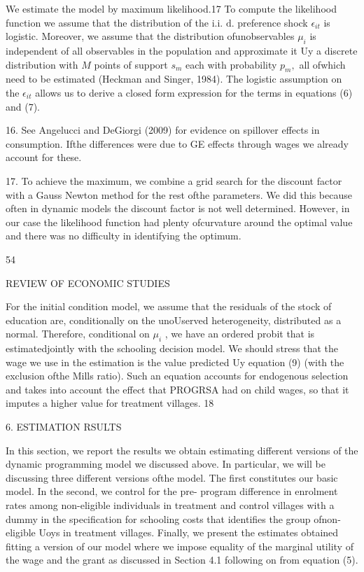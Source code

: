 We estimate the model by maximum likelihood.17 To compute the likelihood function we assume that the distribution of the i.i. $\mathrm{d}$. preference shock $\epsilon_{it}$ is logistic. Moreover, we assume that the distribution ofunobservables $\mu_{i}$ is independent of all observables in the population and approximate it Uy a discrete distribution with $M$ points of support $s_{m}$ each with probability $p_{m},$ all ofwhich need to be estimated (Heckman and Singer, 1984). The logistic assumption on the $\epsilon_{it}$ allows us to derive a closed form expression for the terms in equations (6) and (7).

16. See Angelucci and DeGiorgi (2009) for evidence on spillover effects in consumption. Ifthe differences were due to GE effects through wages we already account for these.

17. To achieve the maximum, we combine a grid search for the discount factor with a Gauss Newton method for the rest ofthe parameters. We did this because often in dynamic models the discount factor is not well determined. However, in our case the likelihood function had plenty ofcurvature around the optimal value and there was no difficulty in identifying the optimum.

54

REVIEW OF ECONOMIC STUDIES

For the initial condition model, we assume that the residuals of the stock of education are, conditionally on the unoUserved heterogeneity, distributed as a normal. Therefore, conditional on $\mu_{i}$ , we have an ordered probit that is estimatedjointly with the schooling decision model. We should stress that the wage we use in the estimation is the value predicted Uy equation (9) (with the exclusion ofthe Mills ratio). Such an equation accounts for endogenous selection and takes into account the effect that PROGRSA had on child wages, so that it imputes a higher value for treatment villages. 18

6. ESTIMATION RSULTS

In this section, we report the results we obtain estimating different versions of the dynamic programming model we discussed above. In particular, we will be discussing three different versions ofthe model. The first constitutes our basic model. In the second, we control for the pre- program difference in enrolment rates among non-eligible individuals in treatment and control villages with a dummy in the specification for schooling costs that identifies the group ofnon- eligible Uoys in treatment villages. Finally, we present the estimates obtained fitting a version of our model where we impose equality of the marginal utility of the wage and the grant as discussed in Section 4.1 following on from equation (5).

